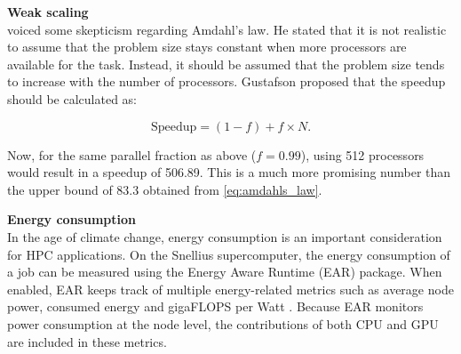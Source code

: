 \medskip

\noindent \textbf{Weak scaling} \\
\cite{gustafsonReevaluatingAmdahlLaw1988} voiced some skepticism regarding Amdahl's law. He stated that it is not realistic to assume that the problem size stays constant when more processors are available for the task. Instead, it should be assumed that the problem size tends to increase with the number of processors. Gustafson proposed that the speedup should be calculated as:

\begin{equation}
    \text{Speedup} = (1-f) + f \times N.
    \label{eq:gustafsons_law}
\end{equation}

\noindent Now, for the same parallel fraction as above ($f=0.99$), using 512 processors would result in a speedup of 506.89. This is a much more promising number than the upper bound of 83.3 obtained from \autoref{eq:amdahls_law}. 

\medskip

\noindent \textbf{Energy consumption} \\
In the age of climate change, energy consumption is an important consideration for HPC applications.  On the Snellius supercomputer, the energy consumption of a job can be measured using the Energy Aware Runtime (EAR) package. When enabled, EAR keeps track of multiple energy-related metrics such as average node power, consumed energy and gigaFLOPS per Watt \citep{corbalanEnergyOptimizationAnalysis2020}. Because EAR monitors power consumption at the node level, the contributions of both CPU and GPU are included in these metrics.